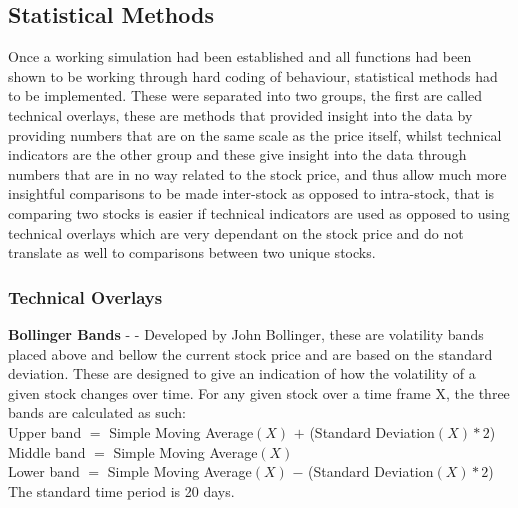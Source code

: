 \documentclass[12pt,a4paper]{article}
\begin{document}
\iffalse
#################################################################################
\fi

\subsection{Statistical Methods}

Once a working simulation had been established and all functions had been shown to be working through hard coding of behaviour, statistical methods had to be implemented. These were separated into two groups, the first are called technical overlays, these are methods that provided insight into the data by providing numbers that are on the same scale as the price itself, whilst technical indicators are the other group and these give insight into the data through numbers that are in no way related to the stock price, and thus allow much more insightful comparisons to be made inter-stock as opposed to intra-stock, that is comparing two stocks is easier if technical indicators are used as opposed to using technical overlays which are very dependant on the stock price and do not translate as well to comparisons between two unique stocks. \\

\iffalse
#################################################################################
\fi

\subsubsection{Technical Overlays}

\textbf{Bollinger Bands} - \cite{Bollinger1992} - Developed by John Bollinger, these are volatility bands placed above and bellow the current stock price and are based on the standard deviation. These are designed to give an indication of how the volatility of a given stock changes over time. For any given stock over a time frame X, the three bands are calculated as such:\\

\noindent
Upper band $=$ Simple Moving Average$(X)$ $+$ (Standard Deviation$(X) * 2$)\\
Middle band $=$ Simple Moving Average$(X)$\\
Lower band $=$ Simple Moving Average$(X)$ $-$ (Standard Deviation$(X) * 2$)\\
The standard time period is 20 days.\\

\iffalse
[]
\fi
\end{document}

